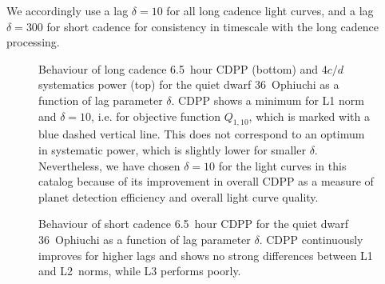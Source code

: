 \documentclass[modern]{aastex62}
\begin{document}
We accordingly use a lag $\delta=10$ for all long cadence light curves, and a lag $\delta=300$ for short cadence for consistency in timescale with the long cadence processing.





\begin{figure*}
\caption{Behaviour of long cadence 6.5~hour CDPP (bottom) and $4 c/d$ systematics power (top) for the quiet dwarf 36~Ophiuchi as a function of lag parameter $\delta$. CDPP shows a minimum for L1 norm and $\delta=10$, i.e. for objective function $Q_{1,10}$, which is marked with a blue dashed vertical line. This does not correspond to an optimum in systematic power, which is slightly lower for smaller $\delta$. Nevertheless, we have chosen $\delta=10$ for the light curves in this catalog because of its improvement in overall CDPP as a measure of planet detection efficiency and overall light curve quality.}
\label{cdpps_lc}
\end{figure*}

\begin{figure}
\caption{Behaviour of short cadence 6.5~hour CDPP for the quiet dwarf 36~Ophiuchi as a function of lag parameter $\delta$. CDPP continuously improves for higher lags and shows no strong differences between L1 and L2~norms, while L3 performs poorly.}
\label{cdpps_sc}
\end{figure}
\end{document}
